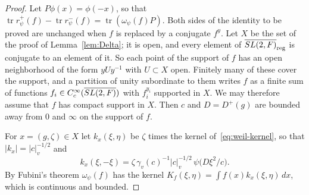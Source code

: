 \begin{proof}
Let $P\phi(x)=\phi(-x)$, so that $\operatorname{tr}r^+_\psi(f)-
\operatorname{tr}r^-_\psi(f)=\operatorname{tr}(\omega_\psi(f)P)$. Both
sides of the identity to be proved are unchanged when $f$ is replaced by a
conjugate $f^y$. Let $X$ be the set of the proof of
Lemma~\ref{lem:Delta}; it is open, and every element of
$\overline{SL(2,F)}_{\mathrm{reg}}$ is conjugate to an element of it. So each point of the
support of $f$ has an open neighborhood of the form $yUy^{-1}$ with
$U\subset X$ open. Finitely many of these cover the support, and a
partition of unity subordinate to them writes $f$ as a finite sum of
functions $f_i\in C_c^\infty(\overline{SL(2,F)})$ with $f_i^{y_i}$ supported in $X$. We
may therefore assume that $f$ has compact support in $X$. Then $c$ and
$D=D^+(g)$ are bounded away from $0$ and $\infty$ on the support of $f$.

For $x=(g,\zeta)\in X$ let $k_x(\xi,\eta)$ be $\zeta$ times the kernel
of~\eqref{eq:weil-kernel}, so that $|k_x|=|c|_v^{-1/2}$ and
\[
k_x(\xi,-\xi)=\zeta\,\gamma_v(c)^{-1}|c|_v^{-1/2}\,\psi\bigl(D\xi^2/c\bigr).
\]
By Fubini's theorem $\omega_\psi(f)$ has the kernel $K_f(\xi,\eta)=\int
f(x)k_x(\xi,\eta)\,dx$, which is continuous and bounded.


\end{proof}

